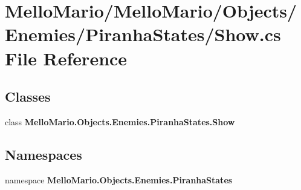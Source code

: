 \section{Mello\+Mario/\+Mello\+Mario/\+Objects/\+Enemies/\+Piranha\+States/\+Show.cs File Reference}
\label{Show_8cs}
\subsection*{Classes}
\begin{DoxyCompactItemize}
\item 
class \textbf{ Mello\+Mario.\+Objects.\+Enemies.\+Piranha\+States.\+Show}
\end{DoxyCompactItemize}
\subsection*{Namespaces}
\begin{DoxyCompactItemize}
\item 
namespace \textbf{ Mello\+Mario.\+Objects.\+Enemies.\+Piranha\+States}
\end{DoxyCompactItemize}
